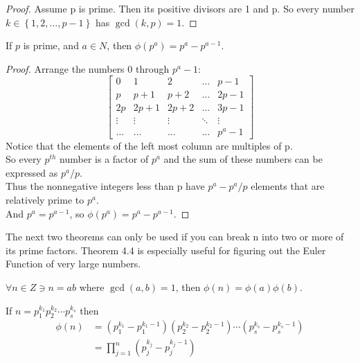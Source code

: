 \begin{proof}
Assume p is prime.  Then its positive divisors are 1 and p.  So every number $k \in \left\{ 1, 2, ..., p-1 \right\}$ has $\gcd(k,p) = 1$.
\end{proof}

\begin{theorem}
If $p$ is prime, and $a \in N$, then $\phi(p^a) = p^a - p^{a-1}$.
\end{theorem}

\begin{proof}
Arrange the numbers 0 through $p^a - 1$:
\[
\begin{bmatrix}
    0 & 1 & 2 & \dots  & p-1 \\
    p & p+1 & p+2 & \dots  & 2p-1 \\
    2p & 2p+1 & 2p+2 & \dots & 3p-1 \\
    \vdots & \vdots & \vdots & \ddots & \vdots \\
    \dots & \dots & \dots & \dots & p^a-1
\end{bmatrix}
\]
Notice that the elements of the left most column are multiples of p. \\So every $p^{th}$ number is a factor of $p^a$ and the sum of these numbers can be expressed as $p^a/p$.  \\Thus the nonnegative integers less than p have $p^a - p^a/p$ elements that are relatively prime to $p^a$. \\And $p^a = p^{a-1}$, so $\phi(p^a) = p^a - p^{a-1}$.
\end{proof}
\vspace{5mm}
The next two theorems can only be used if you can break n into two or more of its prime factors.  Theorem 4.4 is especially useful for figuring out the Euler Function of very large numbers.  
\begin{theorem}
$\forall n \in Z \ni n = ab$ where $\gcd(a,b) =1$, then $\phi(n)=\phi(a)\phi(b)$.
\end{theorem}

\begin{theorem}
If $n=p_1^{k_1}p_2^{k_2}\cdots p_s^{k_s}$ then
\begin{align*}
\phi(n)&=(p_1^{k_1}-p_1^{k_1-1})(p_2^{k_2}-p_2^{k_2-1})\cdots(p_s^{k_s}-p_s^{k_s-1})\\
&=\prod_{j=1}^n (p_j^{k_j}-p_j^{k_j-1})
\end{align*}
\end{theorem}

